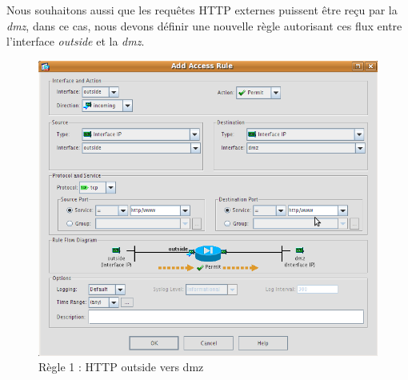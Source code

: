 \documentclass[a4paper,12pt]{article}
\begin{document}
\newpage
Nous souhaitons aussi que les requêtes HTTP externes puissent être reçu par la \textit{dmz}, dans ce cas, nous devons définir une nouvelle règle autorisant ces flux entre l'interface \textit{outside} et la \textit{dmz}.
\begin{figure}[H]
	\center
	\includegraphics[width=15cm]{img/11-httpoutsidedmz.png}
	\caption{Règle 1 : HTTP outside vers dmz}
\end{figure}
\end{document}
